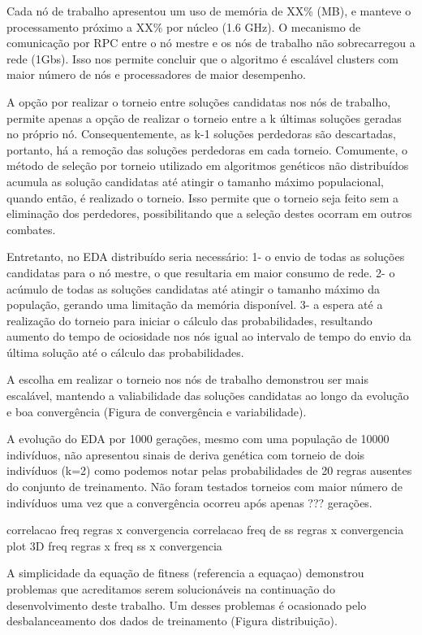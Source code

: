 Cada nó de trabalho apresentou um uso de memória de XX\% (MB), e manteve o processamento próximo a XX\% por núcleo (1.6 GHz). O mecanismo de comunicação por RPC entre o nó mestre e os nós de trabalho não sobrecarregou a rede (1Gbs). Isso nos permite concluir que o algoritmo é escalável clusters com maior número de nós e processadores de maior desempenho.

A opção por realizar o torneio entre soluções candidatas nos nós de trabalho, permite apenas a opção de realizar o torneio entre a k últimas soluções geradas no próprio nó. Consequentemente, as k-1 soluções perdedoras são descartadas, portanto, há a remoção das soluções perdedoras em cada torneio. Comumente, o método de seleção por torneio utilizado em algoritmos genéticos não distribuídos acumula as solução candidatas até atingir o tamanho máximo populacional, quando então, é realizado o torneio. Isso permite que o torneio seja feito sem a eliminação dos perdedores, possibilitando que a seleção destes ocorram em outros combates.

Entretanto, no EDA distribuído seria necessário:
1- o envio de todas as soluções candidatas para o nó mestre, o que resultaria em maior consumo de rede.
2- o acúmulo de todas as soluções candidatas até atingir o tamanho máximo da população, gerando uma limitação da memória disponível.
3- a espera até a realização do torneio para iniciar o cálculo das probabilidades, resultando aumento do tempo de ociosidade nos nós igual ao intervalo de tempo do envio da última solução até o cálculo das probabilidades. 

A escolha em realizar o torneio nos nós de trabalho demonstrou ser mais escalável, mantendo a valiabilidade das soluções candidatas ao longo da evolução e boa convergência (Figura de convergência e variabilidade).

A evolução do EDA por 1000 gerações, mesmo com uma população de 10000 indivíduos, não apresentou sinais de deriva genética com torneio de dois indivíduos (k=2) como podemos notar pelas probabilidades de 20 regras ausentes do conjunto de treinamento. Não foram testados torneios com maior número de indivíduos uma vez que a convergência ocorreu após apenas ??? gerações.  

     
correlacao freq regras x convergencia
correlacao freq de ss regras x convergencia
plot 3D freq regras x freq ss x convergencia


A simplicidade da equação de fitness (referencia a equaçao) demonstrou problemas que acreditamos serem solucionáveis na continuação do desenvolvimento deste trabalho. Um desses problemas é ocasionado pelo desbalanceamento dos dados de treinamento (Figura distribuição). 

